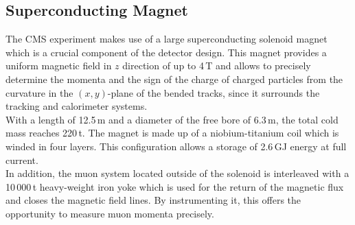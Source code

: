 \subsection{Superconducting Magnet}
\label{subsec:cms_magnet}
The CMS experiment makes use of a large superconducting solenoid magnet which is a crucial component of the detector design. This magnet provides a uniform magnetic field in $z$ direction of up to 4\,T and allows to precisely determine the momenta and the sign of the charge of charged particles from the curvature in the $(x, y)$-plane of the bended tracks, since it surrounds the tracking and calorimeter systems.\\
With a length of 12.5\,m and a diameter of the free bore of 6.3\,m, the total cold mass reaches 220\,t. The magnet is made up of a niobium-titanium coil which is winded in four layers. This configuration allows a storage of 2.6\,GJ energy at full current. \\
In addition, the muon system located outside of the solenoid is interleaved with a 10\,000\,t heavy-weight iron yoke which is used for the return of the magnetic flux and closes the magnetic field lines. By instrumenting it, this offers the opportunity to measure muon momenta precisely.  

